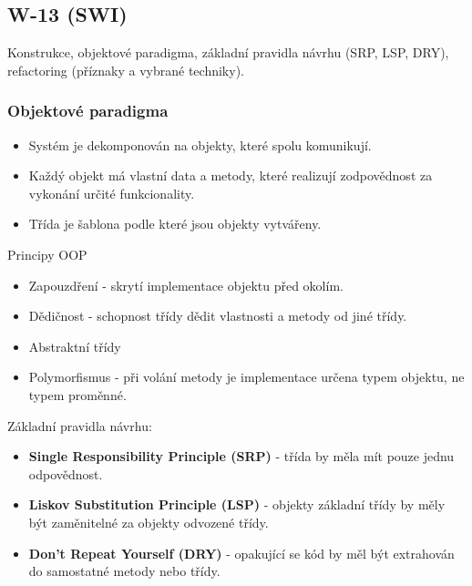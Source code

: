 \subsection{W-13 (SWI)}

Konstrukce, objektové paradigma, základní pravidla návrhu (SRP, LSP, DRY), refactoring (příznaky a vybrané techniky).

\subsubsection*{Objektové paradigma}

\begin{itemize}
  \item Systém je dekomponován na objekty, které spolu komunikují.
  \item Každý objekt má vlastní data a metody, které realizují zodpovědnost za vykonání určité funkcionality.
  \item Třída je šablona podle které jsou objekty vytvářeny.
\end{itemize}

Principy OOP
\begin{itemize}
  \item Zapouzdření - skrytí implementace objektu před okolím.
  \item Dědičnost - schopnost třídy dědit vlastnosti a metody od jiné třídy.
  \item Abstraktní třídy
  \item Polymorfismus - při volání metody je implementace určena typem objektu, ne typem proměnné.
\end{itemize}

Základní pravidla návrhu:
\begin{itemize}
  \item \textbf{Single Responsibility Principle (SRP)} - třída by měla mít pouze jednu odpovědnost.
  \item \textbf{Liskov Substitution Principle (LSP)} - objekty základní třídy by měly být zaměnitelné za objekty odvozené třídy.
  \item \textbf{Don't Repeat Yourself (DRY)} - opakující se kód by měl být extrahován do samostatné metody nebo třídy.
\end{itemize}
